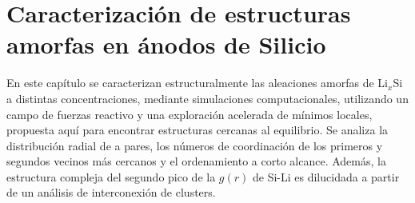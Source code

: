 \chapter[Caracterización de estructuras amorfas en ánodos de Silicio]{
Caracterización de estructuras amorfas en ánodos de Silicio}\label{ch:caracterizacion}
\thispagestyle{empty}

\vspace{50pt}

\begin{adjustwidth}{50pt}{50pt}
    En este capítulo se caracterizan estructuralmente las aleaciones amorfas de
    Li$_x$Si a distintas concentraciones, mediante simulaciones computacionales,
    utilizando un campo de fuerzas reactivo y una exploración acelerada de mínimos
    locales, propuesta aquí para encontrar estructuras cercanas al equilibrio. Se
    analiza la distribución radial de a pares, los números de coordinación de los
    primeros y segundos vecinos más cercanos y el ordenamiento a corto alcance.
    Además, la estructura compleja del segundo pico de la $g(r)$ de Si-Li es 
    dilucidada a partir de un análisis de interconexión de clusters.
\end{adjustwidth}

\clearpage
\newpage
\thispagestyle{empty}
\mbox{}
\newpage












